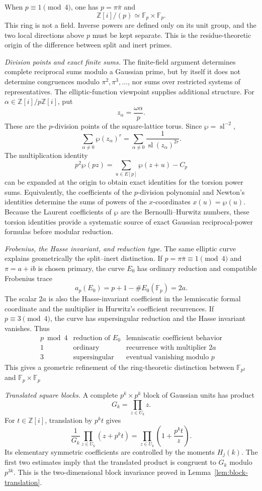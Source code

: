 \documentclass[a4paper,american,11pt]{amsart}
\numberwithin{equation}{section}
\theoremstyle{definition}
\newcommand{\Z}{\mathbb Z}
\newcommand{\F}{\mathbb F}
\DeclareMathOperator{\slf}{sl}
\begin{document}
When $p\equiv1\pmod4$, one has $p=\pi\bar\pi$ and
\[
\Z[i]/(p)\simeq\F_p\times\F_p.
\]
This ring is not a field. Inverse powers are defined only on its unit group, and the two local directions above $p$ must be kept separate. This is the residue-theoretic origin of the difference between split and inert primes.

\emph{Division points and exact finite sums.}
The finite-field argument determines complete reciprocal sums modulo a Gaussian prime, but by itself it does not determine congruences modulo $\pi^2,\pi^3,\ldots$, nor sums over restricted systems of representatives. The elliptic-function viewpoint supplies additional structure. For $\alpha\in\Z[i]/p\Z[i]$, put
\[
z_\alpha=\frac{\omega\alpha}{p}.
\]
These are the $p$-division points of the square-lattice torus. Since $\wp=\slf^{-2}$,
\[
\sum_{\alpha\ne0}\wp(z_\alpha)^r
=
\sum_{\alpha\ne0}\frac1{\slf(z_\alpha)^{2r}}.
\]
The multiplication identity
\[
p^2\wp(pz)=\sum_{u\in E[p]}\wp(z+u)-C_p
\]
can be expanded at the origin to obtain exact identities for the torsion power sums. Equivalently, the coefficients of the $p$-division polynomial and Newton's identities determine the sums of powers of the $x$-coordinates $x(u)=\wp(u)$. Because the Laurent coefficients of $\wp$ are the Bernoulli--Hurwitz numbers, these torsion identities provide a systematic source of exact Gaussian reciprocal-power formulas before modular reduction. 

\emph{Frobenius, the Hasse invariant, and reduction type.}
The same elliptic curve explains geometrically the split--inert distinction. If $p=\pi\bar\pi\equiv1\pmod4$ and $\pi=a+ib$ is chosen primary, the curve $E_0$ has ordinary reduction and compatible Frobenius trace
\[
a_p(E_0)=p+1-\#E_0(\F_p)=2a.
\]
The scalar $2a$ is also the Hasse-invariant coefficient in the lemniscatic formal coordinate and the multiplier in Hurwitz's coefficient recurrences. If $p\equiv3\pmod4$, the curve has supersingular reduction and the Hasse invariant vanishes. Thus
\[
\begin{array}{c|c|c}
p\bmod4 & \text{reduction of }E_0 & \text{lemniscatic coefficient behavior}\\ \hline
1 & \text{ordinary} & \text{recurrence with multiplier }2a\\
3 & \text{supersingular} & \text{eventual vanishing modulo }p
\end{array}
\]
This gives a geometric refinement of the ring-theoretic distinction between $\F_{p^2}$ and $\F_p\times\F_p$ 

\emph{Translated square blocks.}
A complete $p^k\times p^k$ block of Gaussian units has product
\[
G_k=\prod_{z\in U_k}z.
\]
For $t\in\Z[i]$, translation by $p^kt$ gives
\[
\frac1{G_k}\prod_{z\in U_k}(z+p^kt)
=
\prod_{z\in U_k}
\left(1+\frac{p^kt}{z}\right).
\]
Its elementary symmetric coefficients are controlled by the moments $H_j(k)$. The first two estimates imply that the translated product is congruent to $G_k$ modulo $p^{3k}$. This is the two-dimensional block invariance proved in Lemma~\ref{lem:block-translation}.
\end{document}
